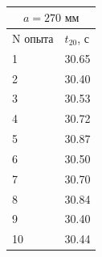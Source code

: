 \documentclass[a4paper]{article}
\begin{document}
\begin{itemize}
\begin{table}
\begin{minipage}{0.32\linewidth}
\begin{tabular}{|l|l|}
\hline
\multicolumn{2}{|c|}{$a = 270 \text{ мм}$} \\
\hline
N опыта & $t_{20}$, с  \\
\hline
1       &   30.65          \\
\hline
2       &   30.40             \\
\hline
3       &   30.53            \\
\hline
4       &   30.72          \\
\hline
5       &   30.87           \\
\hline
6       &   30.50            \\
\hline
7       &   30.70          \\
\hline
8       &   30.84             \\
\hline
9       &   30.40             \\
\hline
10      &   30.44    \\
\hline       
\end{tabular}
\caption{}
\end{minipage}
\end{table}


\end{itemize}
\end{document}
